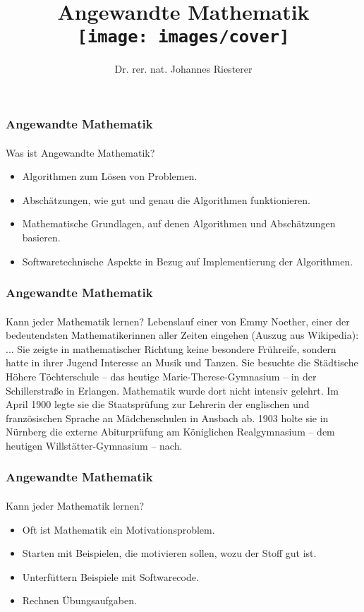 \documentclass{beamer}
\begin{document}
\title[Angewandte Mathematik] %
{Angewandte Mathematik
\\
\texttt{[image: images/cover]}
}
\subtitle{}
\author[Dr. Johannes Riesterer] %
{Dr.  rer. nat. Johannes Riesterer}

\date[KPT 2004] %
{}

\subject{Angewandte Mathematik}

\frame{\titlepage}

\begin{frame}
    \frametitle{Angewandte Mathematik}
\framesubtitle{}
    \begin{block}{Was ist Angewandte Mathematik?}
\begin{itemize}
\pause \item Algorithmen zum Lösen von Problemen.
\pause \item Abschätzungen, wie gut und genau die Algorithmen funktionieren.
\pause \item Mathematische Grundlagen, auf denen Algorithmen und Abschätzungen basieren. 
\pause \item Softwaretechnische Aspekte in Bezug auf  Implementierung der Algorithmen.
\end{itemize}
\end{block}
 \end{frame}

\begin{frame}
    \frametitle{Angewandte Mathematik}
\framesubtitle{}
    \begin{block}{Kann jeder Mathematik lernen?}
 Lebenslauf einer von Emmy Noether, einer der bedeutendsten Mathematikerinnen aller Zeiten eingehen  (Auszug aus Wikipedia):
... Sie zeigte in mathematischer Richtung keine besondere Frühreife, sondern hatte in ihrer Jugend Interesse an Musik und Tanzen. Sie besuchte die Städtische Höhere Töchterschule – das heutige Marie-Therese-Gymnasium – in der Schillerstraße in Erlangen. Mathematik wurde dort nicht intensiv gelehrt. Im April 1900 legte sie die Staatsprüfung zur Lehrerin der englischen und französischen Sprache an Mädchenschulen in Ansbach ab. 1903 holte sie in Nürnberg die externe Abiturprüfung am Königlichen Realgymnasium – dem heutigen Willstätter-Gymnasium – nach. 
\end{block}
 \end{frame}


\begin{frame}
    \frametitle{Angewandte Mathematik}
\framesubtitle{}
    \begin{block}{Kann jeder Mathematik lernen?}
\begin{itemize}
\pause \item Oft ist Mathematik ein Motivationsproblem.
\pause \item Starten mit  Beispielen, die motivieren sollen, wozu der Stoff gut ist.
\pause \item Unterfüttern Beispiele mit  Softwarecode. 
\pause \item Rechnen Übungsaufgaben.
\end{itemize}
\end{block}

 \end{frame}
\end{document}
